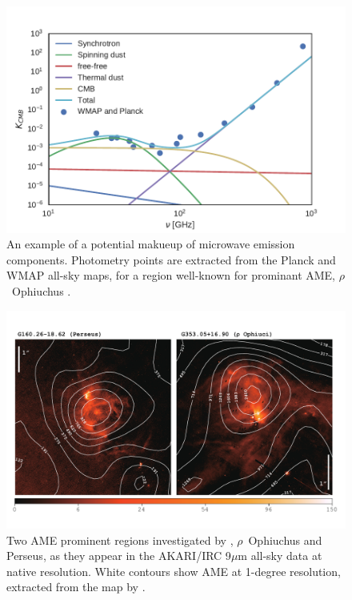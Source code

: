     \begin{figure}
      \centering
      \includegraphics[width=\textwidth]{../Plots/ch_intro/mw_foregrounds_demo_rOph.pdf}
        \caption{An example of a potential makueup of microwave emission components. Photometry points are extracted from the Planck and WMAP all-sky maps, for a region well-known for prominant AME, $\rho$~Ophiuchus \citep{planckxx11}.}
      \label{fig:mw_foregrounds_demo_rOph}
    \end{figure}

    \begin{figure}
      \centering
      \includegraphics[width=\textwidth]{../Plots/ch_intro/AME_contours.pdf}
        \caption{Two AME prominent regions investigated by \cite{planckxx11, tibbs11}, $\rho$~Ophiuchus and Perseus, as they appear in the AKARI/IRC 9$\mu$m all-sky data at native resolution. White contours show AME at 1-degree resolution, extracted from the map by  \cite{planck15X}.}
      \label{fig:AME-contours}
    \end{figure}

